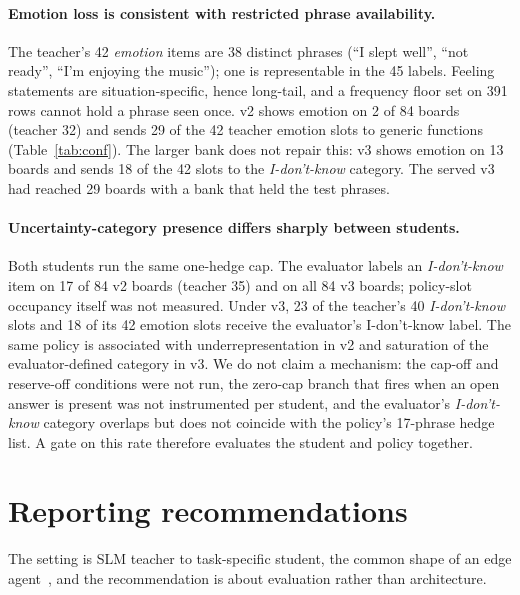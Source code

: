 \paragraph{Emotion loss is consistent with restricted phrase availability.}
The teacher's 42 \emph{emotion} items are 38 distinct phrases (``I slept
well'', ``not ready'', ``I'm enjoying the music''); one is representable
in the 45 labels. Feeling statements are situation-specific, hence
long-tail, and a frequency floor set on 391 rows cannot hold a phrase
seen once. v2 shows emotion on 2 of 84 boards (teacher 32) and sends 29
of the 42 teacher emotion slots to generic functions
(Table~\ref{tab:conf}). The larger bank does not repair this: v3 shows
emotion on 13 boards and sends 18 of the 42 slots to the
\emph{I-don't-know} category. The served
v3 had reached 29 boards with a bank that held the test phrases.

\paragraph{Uncertainty-category presence differs sharply between students.}
Both students run the same one-hedge cap. The evaluator labels an
\emph{I-don't-know} item on 17 of 84 v2 boards (teacher 35) and on all 84
v3 boards; policy-slot occupancy itself was not measured. Under v3, 23 of
the teacher's 40 \emph{I-don't-know} slots and 18 of its 42 emotion slots
receive the evaluator's I-don't-know label. The same policy is associated
with underrepresentation in v2 and saturation of the evaluator-defined
category in v3. We do not claim a mechanism: the cap-off and reserve-off
conditions were not run, the zero-cap branch that fires when an open
answer is present was not instrumented per student, and the evaluator's
\emph{I-don't-know} category overlaps but does not coincide with the
policy's 17-phrase hedge list. A gate on this rate therefore evaluates the student and policy together.

\section{Reporting recommendations}
\label{sec:discussion}

The setting is SLM teacher to task-specific student, the common shape of
an edge agent~\citep{belcak2025,kang2025}, and the recommendation is about
evaluation rather than architecture.

